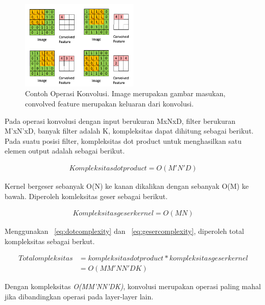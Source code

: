 \begin{figure}
	\centering
	\includegraphics[width=0.50\textwidth]
	{pics/conv.png}
	\caption{Contoh Operasi Konvolusi. Image merupakan gambar masukan, convolved feature merupakan keluaran dari konvolusi.}
	\label{fig:conv}
\end{figure}

Pada operasi konvolusi dengan input berukuran MxNxD, filter berukuran M'xN'xD, banyak filter adalah K, kompleksitas dapat dihitung sebagai berikut. Pada suatu posisi filter, kompleksitas dot product untuk menghasilkan satu elemen output adalah sebagai berikut.

\noindent \begin{align}\label{eq:dotcomplexity} Kompleksitas dot product = O(M'N'D) \end{align}

\noindent Kernel bergeser sebanyak O(N) ke kanan dikalikan dengan sebanyak O(M) ke bawah. Diperoleh komleksitas geser sebagai berikut.

\noindent \begin{align}\label{eq:gesercomplexity} Kompleksitas geser kernel = O(MN) \end{align} 

\noindent Menggunakan \equ~\ref{eq:dotcomplexity} dan \equ~\ref{eq:gesercomplexity}, diperoleh total kompleksitas sebagai berkut.

\noindent \begin{align}\label{eq:convcomplexity} \nonumber Total ompleksitas &= kompleksitas dot product * kompleksitas geser kernel \\ &= O(MM'NN'DK) \end{align}

\noindent Dengan kompleksitas \textit{O(MM'NN'DK)}, konvolusi merupakan operasi paling mahal jika dibandingkan operasi pada layer-layer lain. 

